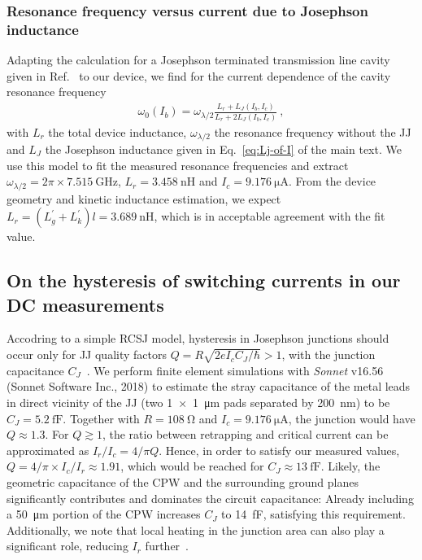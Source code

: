 \subsubsection{Resonance frequency versus current due to Josephson inductance}\label{sec:resfit}

% 
Adapting the calculation for a Josephson terminated transmission line cavity given in Ref.~\cite{pogorzalekHystereticFluxResponse2017} to our device, we find for the current dependence of the cavity resonance frequency
% 
\begin{align}
\omega_0(I_b)=\omega_{\lambda/2}\frac{L_r+L_J(I_b,I_c)}{L_r + 2L_J(I_b,I_c)}\ ,
\end{align}
% 
with $L_r$ the total device inductance, $\omega_{\lambda/2}$ the resonance frequency without the JJ and $L_J$ the Josephson inductance given in Eq.~\eqref{eq:Lj-of-I} of the main text.
% 
We use this model to fit the measured resonance frequencies and extract $\omega_{\lambda/2}=2\pi\times\SI{7.515}{\giga\hertz}$, $L_r=\SI{3.458}{\nano\henry}$ and $I_c=\SI{9.176}{\micro\ampere}$.
% 
From the device geometry and kinetic inductance estimation, we expect $L_r=(L_g^\prime+L_k^\prime)l=\SI{3.689}{\nano\henry}$, which is in acceptable agreement with the fit value.

\subsection{On the hysteresis of switching currents in our DC measurements}\label{sec:hysteresis}
% 
Accodring to a simple RCSJ model, hysteresis in Josephson junctions should occur only for JJ quality factors $Q=R\sqrt{2eI_c C_J/\hbar} > 1$, with the junction capacitance $C_J$~\cite{tinkhamIntroductionSuperconductivity1996}.
% 
We perform finite element simulations with \textit{Sonnet} v16.56 (Sonnet Software Inc., 2018) to estimate the stray capacitance of the metal leads in direct vicinity of the JJ (two \SI{1x1}{\micro\meter} pads separated by \SI{200}{\nano\meter}) to be $C_J=\SI{5.2}{\femto\farad}$.
% 
Together with $R=\SI{108}{\ohm}$ and $I_c=\SI{9.176}{\micro\ampere}$, the junction would have $Q\approx1.3$.
% 
For $Q \gtrsim 1$, the ratio between retrapping and critical current can be approximated as $I_r/I_c=4/\pi Q$.
% 
Hence, in order to satisfy our measured values, $Q=4/\pi\times I_c/ I_r\approx1.91$, which would be reached for $C_J\approx\SI{13}{\femto\farad}$.
% 
Likely, the geometric capacitance of the CPW and the surrounding ground planes significantly contributes and dominates the circuit capacitance:
% 
Already including a \SI{50}{\micro\meter} portion of the CPW increases $C_J$ to \SI{14}{\femto\farad}, satisfying this requirement.
% 
Additionally, we note that local heating in the junction area can also play a significant role, reducing $I_r$ further~\cite{skocpolSelfHeatingHotspots1974,hazraHysteresisSuperconductingShort2010,kumarReversibilitySuperconductingNb2015}.

